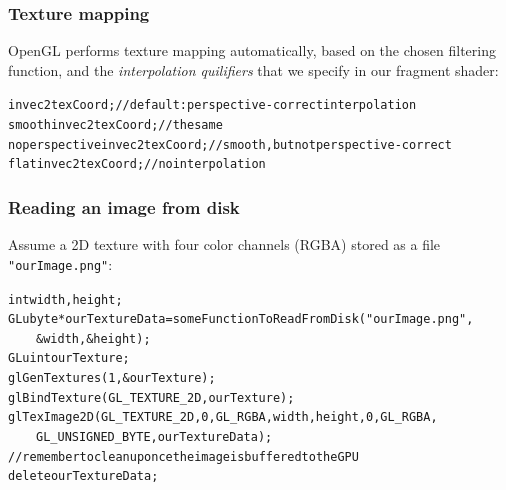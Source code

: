 \documentclass{beamer}
\begin{document}
%
%
%
\begin{frame}
\frametitle{Texture mapping}
OpenGL performs texture mapping automatically, based on the chosen filtering
function, and the \textit{interpolation quilifiers} that we specify in our
fragment shader:

\begin{alltt}\footnotesize
in vec2 texCoord; // default : perspective-correct interpolation\\

smooth in vec2 texCoord; // the same\\

noperspective in vec2 texCoord; // smooth, but not perspective-correct\\

flat in vec2 texCoord; // no interpolation
\end{alltt}
\end{frame}


%
%
%
\begin{frame}
\frametitle{Reading an image from disk}
Assume a 2D texture with four color channels (RGBA) stored as a file
\texttt{"ourImage.png"}:

\begin{alltt}\footnotesize
int width, height;\\
GLubyte* ourTextureData = someFunctionToReadFromDisk("ourImage.png",\\
\ensuremath{\qquad}\&width, \&height);\\

GLuint ourTexture;\\
glGenTextures(1, \&ourTexture);\\
glBindTexture(GL\_TEXTURE\_2D, ourTexture);\\
glTexImage2D(GL\_TEXTURE\_2D, 0, GL\_RGBA, width, height, 0, GL\_RGBA,\\
\ensuremath{\qquad}GL\_UNSIGNED\_BYTE, ourTextureData);\\

// remember to cleanup once the image is buffered to the GPU\\
delete ourTextureData;\\
\end{alltt}
\end{frame}
\end{document}
